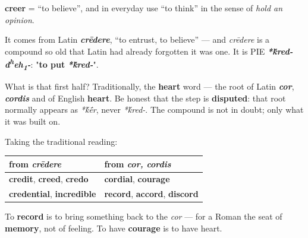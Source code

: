 \begin{cousinweb}
\textbf{creer} = \textquotedblleft{}to believe\textquotedblright{}, and in everyday use \textquotedblleft{}to think\textquotedblright{} in the sense of \emph{hold an opinion}.

It comes from Latin \emph{\textbf{crēdere}}, \textquotedblleft{}to entrust, to believe\textquotedblright{} — and \emph{crēdere} is a compound so old that Latin had already forgotten it was one. It is PIE \emph{\textbf{*\'{k}red-d\textsuperscript{h}eh\textsubscript{1}-}}: "\textbf{to put} \emph{\textbf{*\'{k}red-}}".

What is that first half? Traditionally, the \textbf{heart} word — the root of Latin \emph{\textbf{cor}}, \emph{\textbf{cordis}} and of English \textbf{heart}. Be honest that the step is \textbf{disputed}: that root normally appears as \emph{*\'{k}\'{\={e}}r}, never \emph{*\'{k}red-}. The compound is not in doubt; only what it was built on.

Taking the traditional reading:

\noindent
\begin{tabularx}{\linewidth}{@{}>{\raggedright\arraybackslash}X>{\raggedright\arraybackslash}X@{}}
\toprule
\textbf{from \emph{crēdere}} & \textbf{from \emph{cor, cordis}} \\
\midrule
\textbf{credit}, \textbf{creed}, \textbf{credo} & \textbf{cordial}, \textbf{courage} \\
\textbf{credential}, \textbf{incredible} & \textbf{record}, \textbf{accord}, \textbf{discord} \\
\bottomrule
\end{tabularx}

To \textbf{record} is to bring something back to the \emph{cor} — for a Roman the seat of \textbf{memory}, not of feeling. To have \textbf{courage} is to have heart.
\end{cousinweb}

